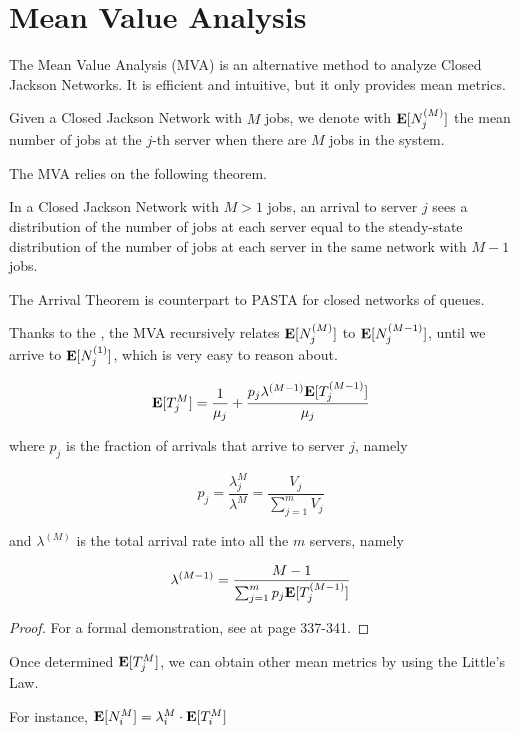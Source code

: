 \section{Mean Value Analysis}
\label{sec:Mean-Value-Analysis}

The Mean Value Analysis (MVA) is an alternative method to analyze Closed Jackson Networks.
It is efficient and intuitive, but it only provides mean metrics.

Given a Closed Jackson Network with $M$ jobs, we denote with $\mathbf{E}[N_{j}^{(M)}]$ the mean number of jobs at the $j$-th server when there are $M$ jobs in the system.

The MVA relies on the following theorem.

\begin{theorem}
\label{thm:Arrival-Theorem}
	In a Closed Jackson Network with $M>1$ jobs, an arrival to server $j$ sees a distribution of the number of jobs at each server equal to the steady-state distribution of the number of jobs at each server in the same network with $M-1$ jobs.
\end{theorem}

The Arrival Theorem is counterpart to PASTA for closed networks of queues.

Thanks to the , the MVA recursively relates $\mathbf{E}[N_{j}^{(M)}]$ to $\mathbf{E}[N_{j}^{(M-1)}]$, until we arrive to $\mathbf{E}[N_{j}^{(1)}]$, which is very easy to reason about.

\begin{theorem}
\label{thm:MVA-Response-Time}

	\begin{equation}
	\label{eqn:MVA-Response-Time}
	\expected{T_{j}^{M}} = 
	\frac{1}{\mu_{j}} + 
	\frac{p_{j} \lambda^{(M-1)} \expected{T_{j}^{(M-1)}}}{\mu_{j}}
	\end{equation}
	
	where $p_{j}$ is the fraction of arrivals that arrive to server $j$, namely
	
	\begin{equation}
	\label{eqn:MVA-Response-Time-Fraction-Arrivals}
	p_{j} = \frac{\lambda_{j}^{M}}{\lambda^{M}} = \frac{V_{j}}{\sum_{j=1}^{m} V_{j}}
	\end{equation}
	
	and $\lambda^{(M)}$ is the total arrival rate into all the $m$ servers, namely
	
	\begin{equation}
	\label{eqn:MVA-Response-Time-Total-Arrival-Rate}
	\lambda^{(M-1)} = \frac{M-1}{\sum_{j=1}^{m} p_{j} \expected{T_{j}^{(M-1)}}}
	\end{equation}	
	
	\begin{proof}
		For a formal demonstration, see \cite{harchol2013performance} at page 337-341.
	\end{proof}
\end{theorem}

Once determined $\mathbf{E}[T_{j}^{M}]$, we can obtain other mean metrics by using the Little's Law.

For instance, $\mathbf{E}[N_{i}^{M}] = \lambda_{i}^{M} \cdot \mathbf{E}[T_{i}^{M}]$